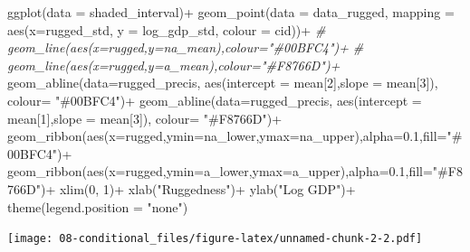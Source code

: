 \documentclass[
]{book}
\newenvironment{Shaded}{\begin{snugshade}}{\end{snugshade}}
\newcommand{\AttributeTok}[1]{\textcolor[rgb]{0.77,0.63,0.00}{#1}}
\newcommand{\CommentTok}[1]{\textcolor[rgb]{0.56,0.35,0.01}{\textit{#1}}}
\newcommand{\DecValTok}[1]{\textcolor[rgb]{0.00,0.00,0.81}{#1}}
\newcommand{\FloatTok}[1]{\textcolor[rgb]{0.00,0.00,0.81}{#1}}
\newcommand{\FunctionTok}[1]{\textcolor[rgb]{0.00,0.00,0.00}{#1}}
\newcommand{\NormalTok}[1]{#1}
\newcommand{\SpecialCharTok}[1]{\textcolor[rgb]{0.00,0.00,0.00}{#1}}
\newcommand{\StringTok}[1]{\textcolor[rgb]{0.31,0.60,0.02}{#1}}
\begin{document}
\begin{Shaded}
\begin{Highlighting}[]
\FunctionTok{ggplot}\NormalTok{(}\AttributeTok{data =}\NormalTok{ shaded\_interval)}\SpecialCharTok{+}
  \FunctionTok{geom\_point}\NormalTok{(}\AttributeTok{data =}\NormalTok{ data\_rugged, }\AttributeTok{mapping =} \FunctionTok{aes}\NormalTok{(}\AttributeTok{x=}\NormalTok{rugged\_std, }\AttributeTok{y =}\NormalTok{ log\_gdp\_std, }\AttributeTok{colour =}\NormalTok{ cid))}\SpecialCharTok{+}
\CommentTok{\# geom\_line(aes(x=rugged,y=na\_mean),colour="\#00BFC4")+}
\CommentTok{\# geom\_line(aes(x=rugged,y=a\_mean),colour="\#F8766D")+}
  \FunctionTok{geom\_abline}\NormalTok{(}\AttributeTok{data=}\NormalTok{rugged\_precis, }\FunctionTok{aes}\NormalTok{(}\AttributeTok{intercept =}\NormalTok{ mean[}\DecValTok{2}\NormalTok{],}\AttributeTok{slope =}\NormalTok{ mean[}\DecValTok{3}\NormalTok{]), }\AttributeTok{colour=} \StringTok{"\#00BFC4"}\NormalTok{)}\SpecialCharTok{+} 
  \FunctionTok{geom\_abline}\NormalTok{(}\AttributeTok{data=}\NormalTok{rugged\_precis, }\FunctionTok{aes}\NormalTok{(}\AttributeTok{intercept =}\NormalTok{ mean[}\DecValTok{1}\NormalTok{],}\AttributeTok{slope =}\NormalTok{ mean[}\DecValTok{3}\NormalTok{]), }\AttributeTok{colour=} \StringTok{"\#F8766D"}\NormalTok{)}\SpecialCharTok{+}
  \FunctionTok{geom\_ribbon}\NormalTok{(}\FunctionTok{aes}\NormalTok{(}\AttributeTok{x=}\NormalTok{rugged,}\AttributeTok{ymin=}\NormalTok{na\_lower,}\AttributeTok{ymax=}\NormalTok{na\_upper),}\AttributeTok{alpha=}\FloatTok{0.1}\NormalTok{,}\AttributeTok{fill=}\StringTok{"\#00BFC4"}\NormalTok{)}\SpecialCharTok{+}
  \FunctionTok{geom\_ribbon}\NormalTok{(}\FunctionTok{aes}\NormalTok{(}\AttributeTok{x=}\NormalTok{rugged,}\AttributeTok{ymin=}\NormalTok{a\_lower,}\AttributeTok{ymax=}\NormalTok{a\_upper),}\AttributeTok{alpha=}\FloatTok{0.1}\NormalTok{,}\AttributeTok{fill=}\StringTok{"\#F8766D"}\NormalTok{)}\SpecialCharTok{+}
  \FunctionTok{xlim}\NormalTok{(}\DecValTok{0}\NormalTok{, }\DecValTok{1}\NormalTok{)}\SpecialCharTok{+}
  \FunctionTok{xlab}\NormalTok{(}\StringTok{"Ruggedness"}\NormalTok{)}\SpecialCharTok{+}
  \FunctionTok{ylab}\NormalTok{(}\StringTok{"Log GDP"}\NormalTok{)}\SpecialCharTok{+}
  \FunctionTok{theme}\NormalTok{(}\AttributeTok{legend.position =}  \StringTok{"none"}\NormalTok{)}
\end{Highlighting}
\end{Shaded}

\texttt{[image: 08-conditional\_files/figure-latex/unnamed-chunk-2-2.pdf]}
\end{document}
